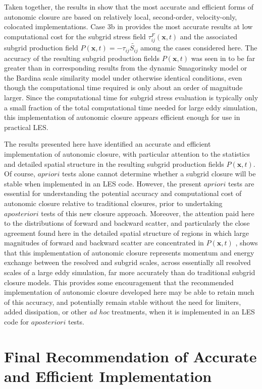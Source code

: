 Taken together, the results in  show that the most accurate and efficient forms of autonomic closure are based on relatively local, second-order, velocity-only, colocated implementations. Case 3b in  provides the most accurate results at low computational cost for the subgrid stress field $\tau_{ij}^F(\mathbf{x},t)$  and the associated subgrid production field $P(\mathbf{x},t) = -\tau_{ij}\widetilde{S_{ij}}$  among the cases considered here. The accuracy of the resulting subgrid production fields  $P(\mathbf{x},t)$ was seen in  to be far greater than in corresponding results from the dynamic Smagorinsky model or the Bardina scale similarity model under otherwise identical conditions, even though the computational time required is only about an order of magnitude larger. Since the computational time for subgrid stress evaluation is typically only a small fraction of the total computational time needed for large eddy simulation, this implementation of autonomic closure appears efficient enough for use in practical LES.

The results presented here have identified an accurate and efficient implementation of autonomic closure, with particular attention to the statistics and detailed spatial structure in the resulting subgrid production fields $P(\mathbf{x},t)$. Of course, $a priori$ tests alone cannot determine whether a subgrid closure will be stable when implemented in an LES code. However, the present $a priori$ tests are essential for understanding the potential accuracy and computational cost of autonomic closure relative to traditional closures, prior to undertaking $a posteriori$ tests of this new closure approach. Moreover, the attention paid here to the distributions of forward and backward scatter, and particularly the close agreement found here in the detailed spatial structure of regions in which large magnitudes of forward and backward scatter are concentrated in $P(\mathbf{x},t)$ , shows that this implementation of autonomic closure represents momentum and energy exchange between the resolved and subgrid scales, across essentially all resolved scales of a large eddy simulation, far more accurately than do traditional subgrid closure models. This provides some encouragement that the recommended implementation of autonomic closure developed here may be able to retain much of this accuracy, and potentially remain stable without the need for limiters, added dissipation, or other \textit{ad hoc} treatments, when it is implemented in an LES code for $a posteriori$ tests.

\section{Final Recommendation of Accurate and Efficient Implementation}

